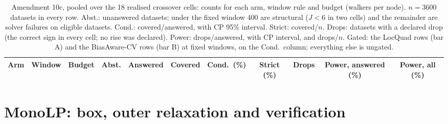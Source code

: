 \documentclass[aps,pre,twocolumn,superscriptaddress,nofootinbib,10pt]{revtex4-2}
\begin{document}
\begin{table}[t]
\caption{Amendment 10c, pooled over the 18 realised crossover cells: counts for each arm, window rule and budget (walkers per node). $n=3600$ datasets in every row. Abst.: unanswered datasets; under the fixed window 400 are structural ($J<6$ in two cells) and the remainder are solver failures on eligible datasets. Cond.: covered/answered, with CP 95\% interval. Strict: covered/$n$. Drops: datasets with a declared drop (the correct sign in every cell; no rise was declared). Power: drops/answered, with CP interval, and drops/$n$. Gated: the \textsf{LocQuad} rows (bar A) and the \textsf{BiasAware-CV} rows (bar B) at fixed windows, on the Cond.\ column; everything else is ungated.}
\label{tab:10c}
\begin{ruledtabular}
\scriptsize
\begin{tabular}{llccccccccc}
Arm & Window & Budget & Abst. & Answered & Covered & Cond.\ (\%) & Strict (\%) & Drops & Power, answered (\%) & Power, all (\%) \\
\hline

\end{tabular}
\end{ruledtabular}
\end{table}

\section{\textsf{MonoLP}: box, outer relaxation and verification}\label{sup:e7}
\end{document}
